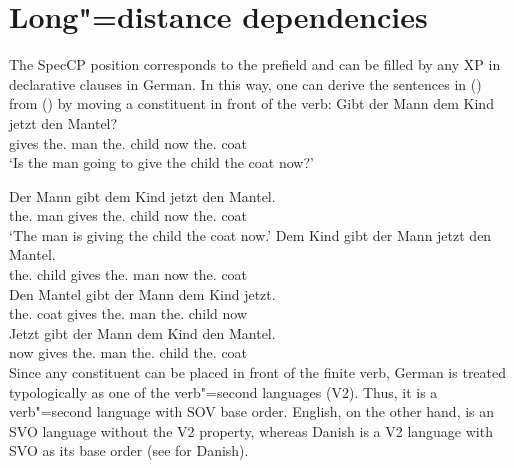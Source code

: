\section{Long"=distance dependencies}


The SpecCP position corresponds to the prefield and can
be filled by any XP in declarative clauses in German. In this way, one can derive the
sentences in () from () by moving a constituent in front of the verb:
\ea
\gll Gibt der Mann dem Kind jetzt den Mantel?\\
     gives the.\nom{} man the.\dat{} child now the.\acc{} coat\\
\glt `Is the man going to give the child the coat now?'
\z

\eal
\ex 
\gll Der Mann gibt dem Kind jetzt den Mantel.\\
     the.\nom{} man gives the.\dat{} child now the.\acc{} coat\\
\glt `The man is giving the child the coat now.'
\ex 
\gll Dem Kind gibt der Mann jetzt den Mantel.\\
     the.\dat{} child gives the.\nom{} man now the.\acc{} coat\\
\ex 
\gll Den Mantel gibt der Mann dem Kind jetzt.\\
	 the.\acc{} coat gives the.\nom{} man the.\dat{} child now\\
\ex 
\gll Jetzt gibt der Mann dem Kind den Mantel.\\
	 now gives the.\nom{} man the.\dat{} child the.\acc{} coat\\
\zl
Since any constituent can be placed in front of the finite verb, German is treated typologically as one of the
verb"=second languages (V2). Thus, it is a verb"=second language with SOV base order.
English, on the other hand, is an SVO language without the V2 property, whereas Danish is a V2 language with SVO
as its base order (see \citealp{Oersnes2009b} for Danish).


